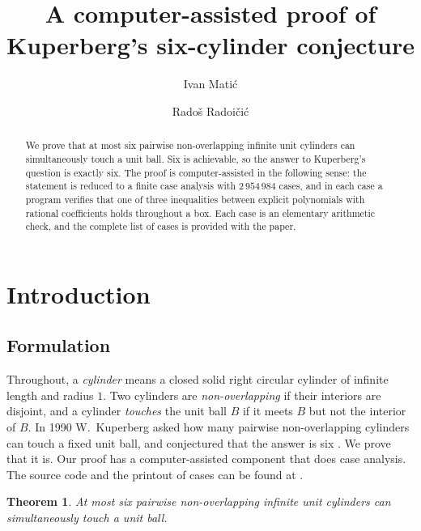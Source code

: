 \documentclass[reqno]{amsart}
\newtheorem{theorem}{Theorem}[section]
\theoremstyle{definition}
\begin{document}
\title{A computer-assisted proof of Kuperberg's six-cylinder conjecture}
\author[I. Mati\'c]{
Ivan Mati\'c}
\address{
Baruch College, City University of New York}
\author[R. Radoi\v ci\'c]{
Rado\v s Radoi\v ci\'c} \address{
Baruch College, City University of New York} 


\begin{abstract}
We prove that at most six pairwise non-overlapping infinite unit cylinders can simultaneously touch
a unit ball. Six is achievable, so the answer to Kuperberg's question is exactly six. The proof is
computer-assisted in the following sense: the statement is reduced to a finite case analysis with
$2\,954\,984$ cases, and in each case a program verifies that one of three inequalities between
explicit polynomials with rational coefficients holds throughout a box. Each case is an elementary
arithmetic check, and the complete list of cases is provided with the paper.
\end{abstract}

\maketitle



\section{Introduction}\label{sec:intro}
\subsection{Formulation}\label{subsection:formulation}

Throughout, a \emph{cylinder} means a closed solid right circular cylinder of infinite length and
radius $1$. Two cylinders are \emph{non-overlapping} if their interiors are disjoint, and a
cylinder \emph{touches} the unit ball $B$ if it meets $B$ but not the interior of $B$. In 1990
W.~Kuperberg asked how many pairwise non-overlapping cylinders can touch a fixed unit ball, and
conjectured that the answer is six \cite{K}. We prove that it is.
Our proof has a computer-assisted component that does case analysis. The source code and the
printout of cases can be found at \cite{MRCode2026}.

\begin{theorem} \label{thm:main}
At most six pairwise non-overlapping infinite unit cylinders can simultaneously touch a unit ball.
\end{theorem}
\end{document}
